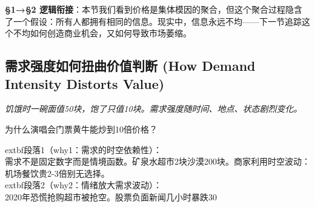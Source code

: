 \documentclass[openany, a4paper, 12pt]{book}
\newenvironment{motivation}{
	\vspace{0.5em}
	\begin{tcolorbox}[
		colback=gray!10,           %
		colframe=gray!60,          %
		title=\textit{本章动机 (Motivation)},
		fonttitle=\bfseries,
		arc=0mm,                   %
		leftrule=3mm               %
		]
		\small \itshape %
	}{
	\end{tcolorbox}
	\vspace{1em}
}
\begin{document}
	\textbf{§1→§2 逻辑衔接}：本节我们看到价格是集体模因的聚合，但这个聚合过程隐含了一个假设：所有人都拥有相同的信息。现实中，信息永远不均——下一节追踪这个不均如何创造商业机会，又如何导致市场萎缩。

	
	\subsection{需求强度如何扭曲价值判断 (How Demand Intensity Distorts Value)}
	\begin{motivation}饥饿时一碗面值50块，饱了只值10块。需求强度随时间、地点、状态剧烈变化。\end{motivation}
	\begin{questionbox}为什么演唱会门票黄牛能炒到10倍价格？\end{questionbox}
		extbf{段落1（why1：需求的时空依赖性）}：\\需求不是固定数字而是情境函数。矿泉水超市2块沙漠200块。商家利用时空波动：机场餐饮贵2-3倍别无选择。\\	extbf{段落2（why2：情绪放大需求波动）}：\\2020年恐慌抢购超市被抢空。股票负面新闻几小时暴跌30%
\end{document}
